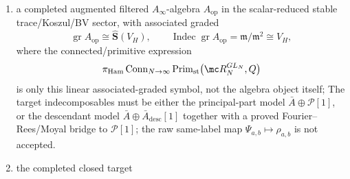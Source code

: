\begin{defn}
\begin{enumerate}[label=(K\arabic*)]
      controls both windows, in which case \(A_{\psi,W}\),
      \(\Theta_{N,W}\), and \(\lambda_{\mathrm{LQT},W}\) are abbreviations
      for the specialization \(K,L\le W\).  The raw same-rank operation that deletes
      multicycle tensors is not a chain map, since
      \(d_{\mathrm{CE}}(\Theta_1(a)\wedge\Theta_1(b))\) has a
      single-cycle commutator component while deletion before the
      differential gives zero.  The finite-rank bridge is the
      separated-block stabilization zigzag: with
      \(B(K,L)=\max(K,L+2)\) and \(M=L\,B(K,L)\), let
      \(\beta_{M,K,L}\) be the normalized signed average over injections
      of connected Hopf factors into the \(L\) labeled diagonal
      \(B(K,L)\)-blocks, read separated blocks back by
      \(\alpha_{M,K,L}\), so that
      \(\alpha_{M,K,L}\beta_{M,K,L}=\operatorname{id}\), and use
      \[
        P^{\mathrm{sep}}_{M,K,L}
        =
        \beta_{M,K,L}P_{1\mathrm{cyc}}\alpha_{M,K,L}.
      \]
      A same-rank chain-homotopy bridge is blocked by the collision coderivation
      \[
        \Gamma_N=d_{\mathrm{same}}F_N-F_Nd_{\oplus},
        \qquad
        \Gamma_N(\Theta_1^N(a)\wedge\Theta_1^N(b))
        =
        \pm\Theta_1^N(ab-(-1)^{|a||b|}ba).
      \]
      The scalar quotient is a chain
      quotient only after killing the scalar-Koszul subcomplex
      \(\Theta_1(\psi)\mapsto\Theta_1(xy-yx)\), or after passing to
      homology; killing \(\Theta_1(\psi)\) alone is not a chain map;
    \item a completed augmented filtered \(A_\infty\)-algebra
      \(A_{\mathrm{op}}\) in the scalar-reduced stable trace/Koszul/BV
      sector, with associated graded
      \[
        \operatorname{gr}A_{\mathrm{op}}\cong
        \widehat{\mathbf S}(V_H),
        \qquad
        \operatorname{Indec}\operatorname{gr}A_{\mathrm{op}}
          =\mathfrak m/\mathfrak m^2\cong V_H,
      \]
      where the connected/primitive expression
      \[
        \pi_{\mathrm{Ham}}
        \operatorname{Conn}_{N\to\infty}
        \operatorname{Prim}_{\mathrm{st}}
        \bigl(\mc R_N^{GL_N},Q\bigr)
      \]
      is only this linear associated-graded symbol, not the algebra object
      itself;
      The target indecomposables must be either the principal-part model
      \(\bar A\oplus\mathcal P[1]\), or the descendant model
      \(\bar A\oplus\bar A_{\mathrm{desc}}[1]\) together with a proved
      Fourier--Rees/Moyal bridge to \(\mathcal P[1]\); the raw same-label
      map \(\Psi_{a,b}\mapsto\rho_{a,b}\) is not accepted.
    \item the completed closed target

\end{enumerate}
\end{defn}

